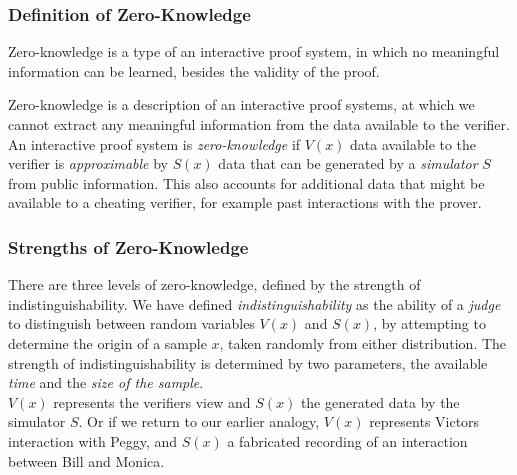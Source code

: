 %
%

\subsubsection{Definition of Zero-Knowledge}
Zero-knowledge is a type of an interactive proof system, in which no meaningful information can be learned, besides the validity of the proof.

Zero-knowledge is a description of an interactive proof systems, at which we cannot extract any meaningful information from the data available to the verifier.
\bigskip
\newline
An interactive proof system is \textit{zero-knowledge} if $V(x)$ data available to the verifier is \textit{approximable} by $S(x)$ data that can be generated by a \textit{simulator} $S$ from public information.
This also accounts for additional data that might be available to a cheating verifier, for example past interactions with the prover.

\subsubsection{Strengths of Zero-Knowledge}
There are three levels of zero-knowledge, defined by the strength of indistinguishability.
We have defined \textit{indistinguishability} as the ability of a \textit{judge} to distinguish between random variables $V(x)$ and $S(x)$, by attempting to determine the origin of a sample $x$, taken randomly from either distribution.
The strength of indistinguishability is determined by two parameters, the available \textit{time} and the \textit{size of the sample}.\\
\newline
$V(x)$ represents the verifiers view and $S(x)$ the generated data by the simulator $S$. Or if we return to our earlier analogy, $V(x)$ represents Victors interaction with Peggy, and $S(x)$ a fabricated recording of an interaction between Bill and Monica.

